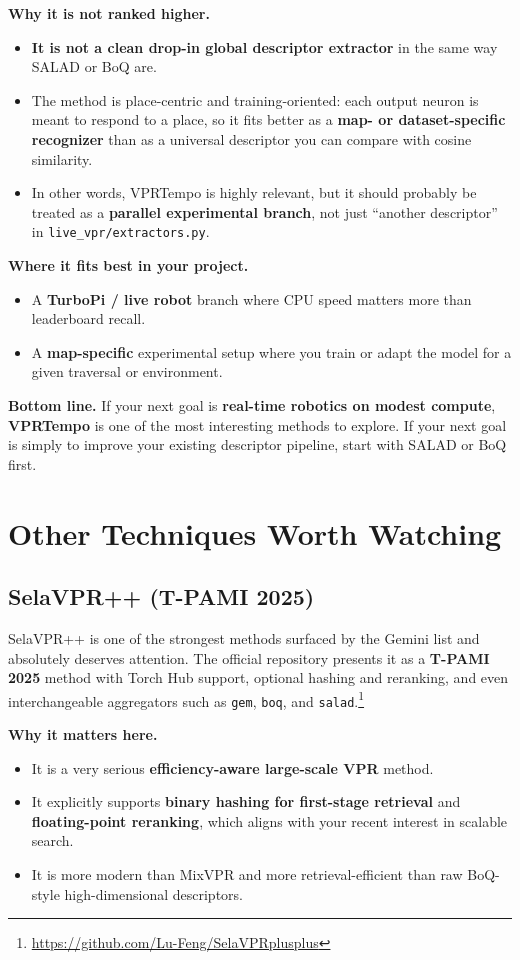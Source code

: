\documentclass[11pt]{article}
\begin{document}
\textbf{Why it is not ranked higher.}
\begin{itemize}[leftmargin=*]
  \item \textbf{It is not a clean drop-in global descriptor extractor} in the same way SALAD or BoQ are.
  \item The method is place-centric and training-oriented: each output neuron is meant to respond to a place, so it fits better as a \textbf{map- or dataset-specific recognizer} than as a universal descriptor you can compare with cosine similarity.
  \item In other words, VPRTempo is highly relevant, but it should probably be treated as a \textbf{parallel experimental branch}, not just ``another descriptor'' in \texttt{live\_vpr/extractors.py}.
\end{itemize}

\textbf{Where it fits best in your project.}
\begin{itemize}[leftmargin=*]
  \item A \textbf{TurboPi / live robot} branch where CPU speed matters more than leaderboard recall.
  \item A \textbf{map-specific} experimental setup where you train or adapt the model for a given traversal or environment.
\end{itemize}

\textbf{Bottom line.} If your next goal is \textbf{real-time robotics on modest compute}, \textbf{VPRTempo} is one of the most interesting methods to explore. If your next goal is simply to improve your existing descriptor pipeline, start with SALAD or BoQ first.

\section*{Other Techniques Worth Watching}

\subsection*{SelaVPR++ (T-PAMI 2025)}
SelaVPR++ is one of the strongest methods surfaced by the Gemini list and absolutely deserves attention. The official repository presents it as a \textbf{T-PAMI 2025} method with Torch Hub support, optional hashing and reranking, and even interchangeable aggregators such as \texttt{gem}, \texttt{boq}, and \texttt{salad}.\footnote{\url{https://github.com/Lu-Feng/SelaVPRplusplus}}

\textbf{Why it matters here.}
\begin{itemize}[leftmargin=*]
  \item It is a very serious \textbf{efficiency-aware large-scale VPR} method.
  \item It explicitly supports \textbf{binary hashing for first-stage retrieval} and \textbf{floating-point reranking}, which aligns with your recent interest in scalable search.
  \item It is more modern than MixVPR and more retrieval-efficient than raw BoQ-style high-dimensional descriptors.
\end{itemize}
\end{document}
